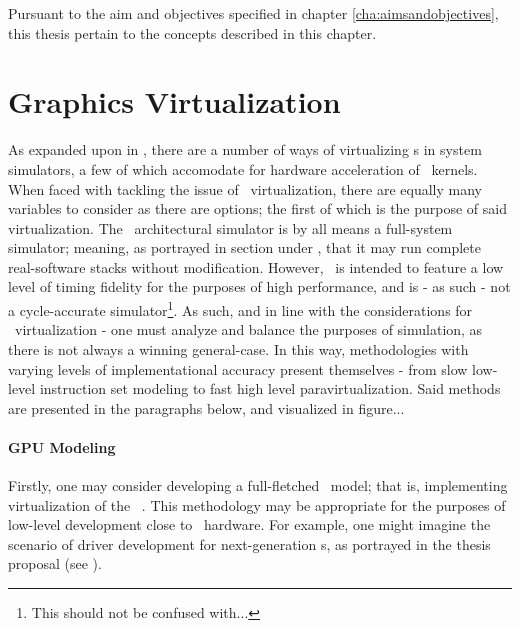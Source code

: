 \noindent
Pursuant to the aim and objectives specified in chapter \ref{cha:aimsandobjectives}, this thesis pertain to the concepts described in this chapter.

\section{Graphics Virtualization}
\label{sec:background_graphicsvirtualization}
As expanded upon in , there are a number of ways of virtualizing \dvttermgpu s in system simulators, a few of which accomodate for hardware acceleration of \dvttermgpu\ kernels.
When faced with tackling the issue of \dvttermgpu\ virtualization, there are equally many variables to consider as there are options; the first of which is the purpose of said virtualization.
The \dvttermsimics\ architectural simulator is by all means a full-system simulator; meaning, as portrayed in section  under , that it may run complete real-software stacks without modification.
However, \dvttermsimics\ is intended to feature a low level of timing fidelity for the purposes of high performance, and is - as such - not a cycle-accurate simulator\footnote{This should not be confused with...}.
As such, and in line with the considerations for \dvttermgpu\ virtualization - one must analyze and balance the purposes of simulation, as there is not always a winning general-case.
In this way, methodologies with varying levels of implementational accuracy present themselves - from slow low-level instruction set modeling to fast high level paravirtualization.
Said methods are presented in the paragraphs below, and visualized in figure...

\paragraph{GPU Modeling}
\label{par:background_graphicsvirtualization_gpumodeling}
Firstly, one may consider developing a full-fletched \dvttermgpu\ model; that is, implementing virtualization of the \dvttermgpu\ \dvttermisa .
This methodology may be appropriate for the purposes of low-level development close to \dvttermgpu\ hardware.
For example, one might imagine the scenario of driver development for next-generation \dvttermgpu s, as portrayed in the thesis proposal (see ).

